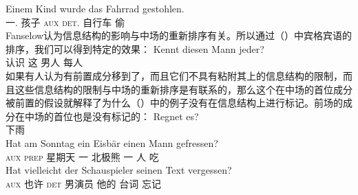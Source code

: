 \ex
\gll Einem Kind wurde das Fahrrad gestohlen.\\
     一.\dat{} 孩子 \textsc{aux} \textsc{det}.\nom{} 自行车 偷\\
\zl
Fanselow认为信息结构的影响与中场的重新排序有关。所以通过（）中宾格宾语的排序，我们可以得到特定的效果：
\ea
\gll Kennt diesen Mann jeder?\\
     认识 这 男人 每人\\
\z
如果有人认为有前置成分移到了\vfc，而且它们不具有粘附其上的信息结构的限制，而且这些信息结构的限制与中场的重新排序是有联系的，那么这个在中场的首位成分被前置的假设就解释了为什么（）中的例子没有在信息结构上进行标记。前场的成分在中场的首位也是没有标记的：
\eal
\ex
\gll Regnet es?\\
     下雨 \expl\\
\ex 
\gll Hat am Sonntag ein Eisbär einen Mann gefressen?\\
     \textsc{aux} \textsc{prep} 星期天  一   北极熊 一 人 吃\\
\ex 
\gll Hat vielleicht der Schauspieler seinen Text vergessen?\\
     \textsc{aux} 也许    \textsc{det} 男演员 他的 台词 忘记\\
